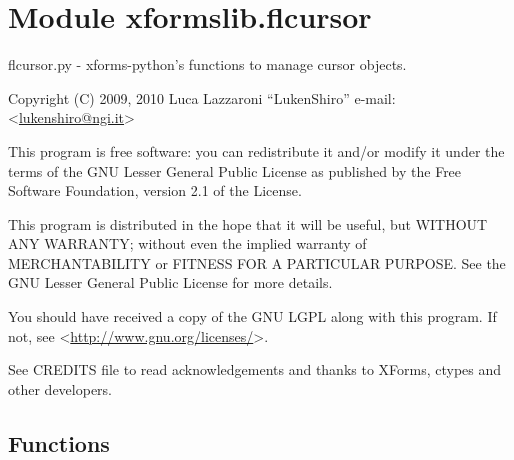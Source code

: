 %
%
%


\section{Module xformslib.flcursor}

    \label{xformslib:flcursor}

flcursor.py - xforms-python's functions to manage cursor objects.

Copyright (C) 2009, 2010  Luca Lazzaroni ``LukenShiro''
e-mail: <\href{mailto:lukenshiro@ngi.it}{lukenshiro@ngi.it}>

This program is free software: you can redistribute it and/or modify
it under the terms of the GNU Lesser General Public License as
published by the Free Software Foundation, version 2.1 of the License.

This program is distributed in the hope that it will be useful,
but WITHOUT ANY WARRANTY; without even the implied warranty of
MERCHANTABILITY or FITNESS FOR A PARTICULAR PURPOSE. See the
GNU Lesser General Public License for more details.

You should have received a copy of the GNU LGPL along with this
program. If not, see <\href{http://www.gnu.org/licenses/}{http://www.gnu.org/licenses/}>.

See CREDITS file to read acknowledgements and thanks to XForms,
ctypes and other developers.


  \subsection{Functions}

    \label{xformslib:flcursor:fl_set_cursor}


